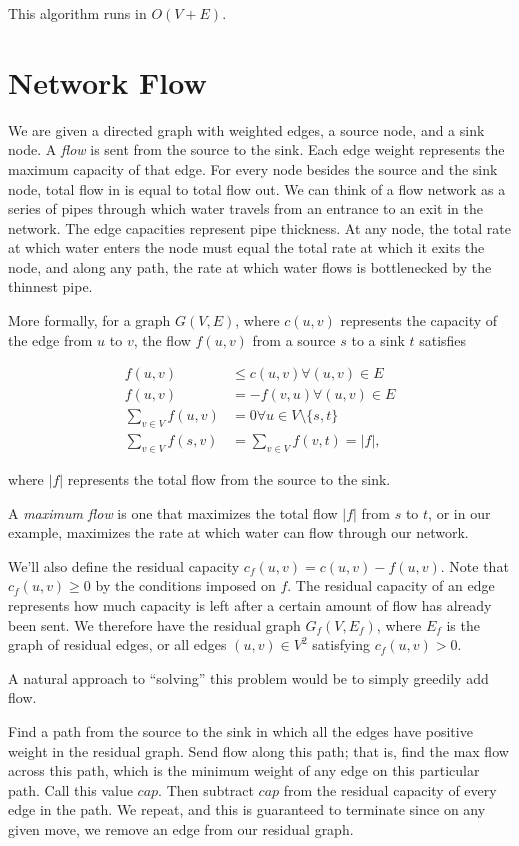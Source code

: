 This algorithm runs in $O(V+E)$.

\section{Network Flow}

We are given a directed graph with weighted edges, a source node, and a sink node. A \textit{flow} is sent from the source to the sink. Each edge weight represents the maximum capacity of that edge. For every node besides the source and the sink node, total flow in is equal to total flow out. We can think of a flow network as a series of pipes through which water travels from an entrance to an exit in the network. The edge capacities represent pipe thickness. At any node, the total rate at which water enters the node must equal the total rate at which it exits the node, and along any path, the rate at which water flows is bottlenecked by the thinnest pipe.

More formally, for a graph $G(V,E)$, where $c(u,v)$ represents the capacity of the edge from $u$ to $v$, the flow $f(u,v)$ from a source $s$ to a sink $t$ satisfies

\begin{align*}
f(u,v) &\le c(u,v) \forall (u,v) \in E \\
f(u,v) &= -f(v,u) \forall (u,v) \in E \\
\sum_{v \in V} f(u,v) &= 0 \forall u \in V \setminus \{s,t\} \\
\sum_{v \in V} f(s,v) &= \sum_{v \in V} f(v,t) = |f|,
\end{align*}

where $|f|$ represents the total flow from the source to the sink.

A \textit{maximum flow} is one that maximizes the total flow $|f|$ from $s$ to $t$, or in our example, maximizes the rate at which water can flow through our network.

We'll also define the residual capacity $c_f(u,v) = c(u,v) - f(u,v)$. Note that $c_f(u,v) \ge 0$ by the conditions imposed on $f$. The residual capacity of an edge represents how much capacity is left after a certain amount of flow has already been sent. We therefore have the residual graph $G_f(V,E_f)$, where $E_f$ is the graph of residual edges, or all edges $(u,v) \in V^2$ satisfying $c_f(u,v) > 0$.

A natural approach to ``solving'' this problem would be to simply greedily add flow.

Find a path from the source to the sink in which all the edges have positive weight in the residual graph. Send flow along this path; that is, find the max flow across this path, which is the minimum weight of any edge on this particular path. Call this value $cap$. Then subtract $cap$ from the residual capacity of every edge in the path. We repeat, and this is guaranteed to terminate since on any given move, we remove an edge from our residual graph.

